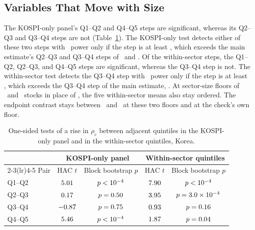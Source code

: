 \documentclass[a4paper,fleqn]{cas-sc}
\begin{document}
\subsection{Variables That Move with Size}\label{subsec:size_confounds}

The KOSPI-only panel's Q1--Q2 and Q4--Q5 steps are significant, whereas its Q2--Q3 and Q3--Q4 steps are not (Table~\ref{tab:size_confound_tests}). The KOSPI-only test detects either of these two steps with \detectPowerPct\ power only if the step is at least \kospiDetectMin, which exceeds the main estimate's Q2--Q3 and Q3--Q4 steps of \rhoCStepHeadlineQtwoQthree\ and \rhoCStepHeadlineQthreeQfour. Of the within-sector steps, the Q1--Q2, Q2--Q3, and Q4--Q5 steps are significant, whereas the Q3--Q4 step is not. The within-sector test detects the Q3--Q4 step with \detectPowerPct\ power only if the step is at least \detectWithinSectorQthreeQfour, which exceeds the Q3--Q4 step of the main estimate, \rhoCStepHeadlineQthreeQfourFine. At sector-size floors of \minSectorSizeLo\ and \minSectorSizeHi\ stocks in place of \minSectorSize, the five within-sector means also stay ordered. The endpoint contrast stays between \rhoCGapWithinSectorFloorMin\ and \rhoCGapWithinSectorFloorMax\ at these two floors and at the check's own floor.

\begin{table}[pos=htbp]
\centering
\begin{threeparttable}
\caption{One-sided tests of a rise in $\rho_c$ between adjacent quintiles in the KOSPI-only panel and in the within-sector quintiles, Korea.}\label{tab:size_confound_tests}
\begin{tabular}{lcccc}
\toprule
 & \multicolumn{2}{c}{KOSPI-only panel} & \multicolumn{2}{c}{Within-sector quintiles} \\
\cmidrule(lr){2-3}\cmidrule(lr){4-5}
Pair & HAC $t$ & Block bootstrap $p$ & HAC $t$ & Block bootstrap $p$ \\
\midrule
Q1--Q2 & $5.01$ & $p < 10^{-4}$ & $7.90$ & $p < 10^{-4}$ \\
Q2--Q3 & $0.17$ & $p = 0.50$ & $3.95$ & $p = 3.0 \times 10^{-4}$ \\
Q3--Q4 & $-0.87$ & $p = 0.75$ & $0.93$ & $p = 0.16$ \\
Q4--Q5 & $5.46$ & $p < 10^{-4}$ & $1.87$ & $p = 0.04$ \\
\bottomrule
\end{tabular}
\end{threeparttable}
\end{table}
\end{document}
